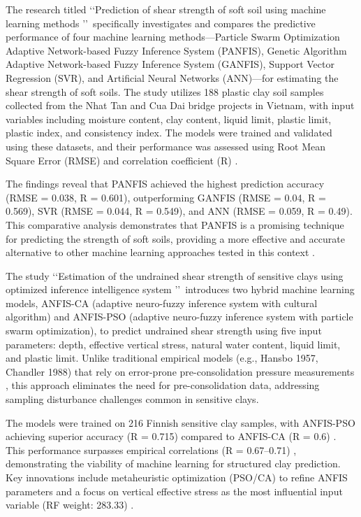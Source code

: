 \documentclass[12pt,a4paper]{article}
\begin{document}
	The research titled \lq\lq Prediction of shear strength of soft soil using machine learning methods \rq\rq\ specifically investigates and compares the predictive performance of four machine learning methods—Particle Swarm Optimization Adaptive Network-based Fuzzy Inference System (PANFIS), Genetic Algorithm Adaptive Network-based Fuzzy Inference System (GANFIS), Support Vector Regression (SVR), and Artificial Neural Networks (ANN)—for estimating the shear strength of soft soils. The study utilizes 188 plastic clay soil samples collected from the Nhat Tan and Cua Dai bridge projects in Vietnam, with input variables including moisture content, clay content, liquid limit, plastic limit, plastic index, and consistency index. The models were trained and validated using these datasets, and their performance was assessed using Root Mean Square Error (RMSE) and correlation coefficient (R) \cite{PHAM2018181}.
	
	The findings reveal that PANFIS achieved the highest prediction accuracy (RMSE = 0.038, R = 0.601), outperforming GANFIS (RMSE = 0.04, R = 0.569), SVR (RMSE = 0.044, R = 0.549), and ANN (RMSE = 0.059, R = 0.49). This comparative analysis demonstrates that PANFIS is a promising technique for predicting the strength of soft soils, providing a more effective and accurate alternative to other machine learning approaches tested in this context \cite{PHAM2018181}.
	
	The study \lq\lq Estimation of the undrained shear strength of sensitive clays using optimized inference intelligence system \rq\rq\  introduces two hybrid machine learning models, ANFIS-CA (adaptive neuro-fuzzy inference system with cultural algorithm) and ANFIS-PSO (adaptive neuro-fuzzy inference system with particle swarm optimization), to predict undrained shear strength using five input parameters: depth, effective vertical stress, natural water content, liquid limit, and plastic limit. Unlike traditional empirical models (e.g., Hansbo 1957, Chandler 1988) that rely on error-prone pre-consolidation pressure measurements \cite{Tran_Ho_Van_Le_Prakash_Pham_2022,20210135}, this approach eliminates the need for pre-consolidation data, addressing sampling disturbance challenges common in sensitive clays.
	
	The models were trained on 216 Finnish sensitive clay samples, with ANFIS-PSO achieving superior accuracy (R = 0.715) compared to ANFIS-CA (R = 0.6) \cite{Tran_Ho_Van_Le_Prakash_Pham_2022}. This performance surpasses empirical correlations (R = 0.67–0.71) \cite{20210135}, demonstrating the viability of machine learning for structured clay prediction. Key innovations include metaheuristic optimization (PSO/CA) to refine ANFIS parameters and a focus on vertical effective stress as the most influential input variable (RF weight: 283.33) \cite{Tran_Ho_Van_Le_Prakash_Pham_2022}.
	
\end{document}
